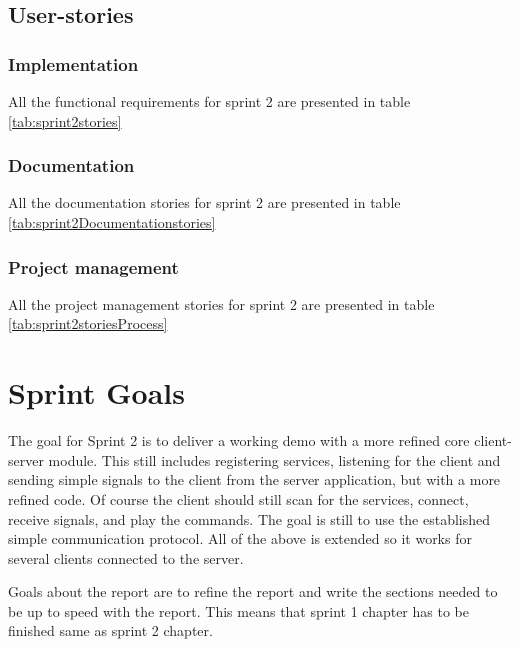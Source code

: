 \subsection{User-stories}

\subsubsection*{Implementation}
All the functional requirements for sprint 2 are presented in table \ref{tab:sprint2stories}

\subsubsection*{Documentation}
All the documentation stories for sprint 2 are presented in table \ref{tab:sprint2Documentationstories}

\subsubsection*{Project management}
All the project management stories for sprint 2 are presented in table \ref{tab:sprint2storiesProcess}

\section{Sprint Goals}
The goal for Sprint 2 is to deliver a working demo with a more refined core client-server module. 
This still includes registering services, listening for the client and sending simple signals to the client from the server application, but with a more refined code. 
Of course the client should still scan for the services, connect, receive signals, and play the commands. 
The goal is still to use the established simple communication protocol. 
All of the above is extended so it works for several clients connected to the server.

Goals about the report are to refine the report and write the sections needed to be up to speed with the report. This means that sprint 1 chapter has to be finished same as sprint 2 chapter. 

